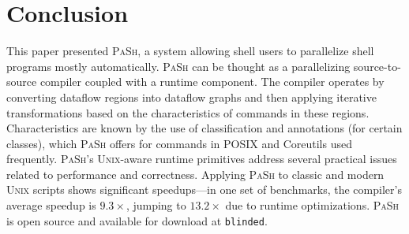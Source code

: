 \documentclass[sigplan, review, screen, anonymous]{acmart}
\newcommand{\ttt}[1]{\texttt{#1}}
\newcommand{\kk}[1]{[{\color{magenta}kk: #1}]}
\newcommand{\km}[1]{[{\color{blue}km: #1}]}
\newcommand{\sys}{{\scshape PaSh}\xspace}
\newcommand{\unix}{{\scshape Unix}\xspace}
\begin{document}
% 



  

  

\section{Conclusion}
\label{discussion}

This paper presented \sys, a system allowing shell users to parallelize shell programs mostly automatically.
\sys can be thought as a parallelizing source-to-source compiler coupled with a runtime component.
The compiler operates by converting dataflow regions into dataflow graphs and then applying iterative transformations based on the characteristics of commands in these regions.
Characteristics are known by the  use of classification and annotations (for certain classes), which \sys offers for commands in POSIX and Coreutils used frequently.
\sys's \unix-aware runtime primitives address several practical issues related to performance and correctness.
Applying \sys to classic and modern \unix scripts shows significant speedups---in one set of benchmarks, the compiler's average speedup is $9.3\times$, jumping to $13.2\times$ due to runtime optimizations.
\sys is open source and available for download at \ttt{blinded}.
\end{document}

